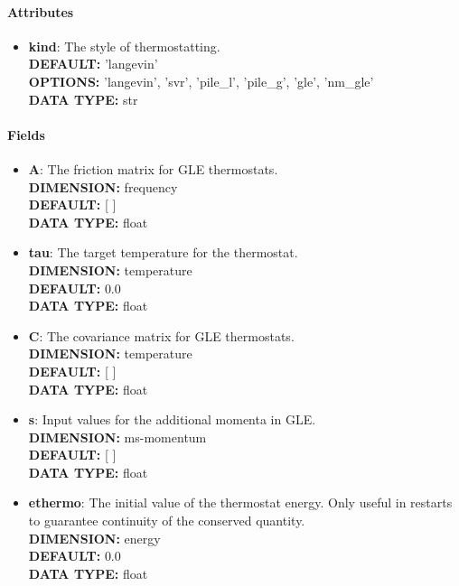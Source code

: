 \begin{itemize}
\paragraph{Attributes}
 \begin{itemize}
\item {\bf kind}:
 The style of thermostatting.
{\\ \bf DEFAULT: }'langevin'
{\\ \bf OPTIONS: }'langevin', 'svr', 'pile\_l', 'pile\_g', 'gle', 'nm\_gle'
{\\ \bf DATA TYPE: }str
\end{itemize}
 
\paragraph{Fields}
 \begin{itemize}
\item {\bf A}:
 The friction matrix for GLE thermostats.
{\\ \bf DIMENSION: }frequency
{\\ \bf DEFAULT: }[ ]
{\\ \bf DATA TYPE: }float
\item {\bf tau}:
 The target temperature for the thermostat.
{\\ \bf DIMENSION: }temperature
{\\ \bf DEFAULT: }0.0
{\\ \bf DATA TYPE: }float
\item {\bf C}:
 The covariance matrix for GLE thermostats.
{\\ \bf DIMENSION: }temperature
{\\ \bf DEFAULT: }[ ]
{\\ \bf DATA TYPE: }float
\item {\bf s}:
 Input values for the additional momenta in GLE.
{\\ \bf DIMENSION: }ms-momentum
{\\ \bf DEFAULT: }[ ]
{\\ \bf DATA TYPE: }float
\item {\bf ethermo}:
 The initial value of the thermostat energy. Only useful in restarts to guarantee continuity of the conserved quantity. 
{\\ \bf DIMENSION: }energy
{\\ \bf DEFAULT: }0.0
{\\ \bf DATA TYPE: }float
\end{itemize}
 

\end{itemize}
